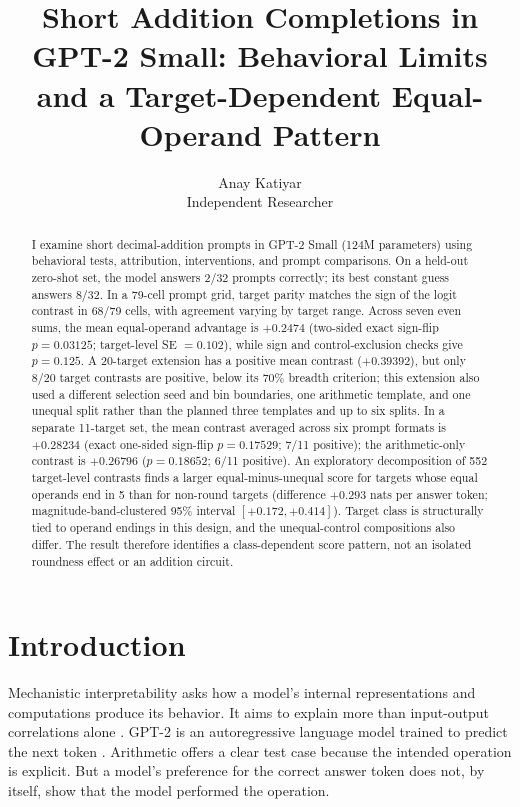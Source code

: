 \documentclass[11pt]{article}
\title{Short Addition Completions in GPT-2 Small: Behavioral Limits and a Target-Dependent Equal-Operand Pattern}
\author{Anay Katiyar\\\small Independent Researcher}
\date{}
\begin{document}
\maketitle

\begin{abstract}
I examine short decimal-addition prompts in GPT-2 Small (124M parameters) using behavioral tests, attribution, interventions, and prompt comparisons. On a held-out zero-shot set, the model answers 2/32 prompts correctly; its best constant guess answers 8/32. In a 79-cell prompt grid, target parity matches the sign of the logit contrast in 68/79 cells, with agreement varying by target range. Across seven even sums, the mean equal-operand advantage is $+0.2474$ (two-sided exact sign-flip $p=0.03125$; target-level SE $=0.102$), while sign and control-exclusion checks give $p=0.125$. A 20-target extension has a positive mean contrast ($+0.39392$), but only 8/20 target contrasts are positive, below its 70\% breadth criterion; this extension also used a different selection seed and bin boundaries, one arithmetic template, and one unequal split rather than the planned three templates and up to six splits. In a separate 11-target set, the mean contrast averaged across six prompt formats is $+0.28234$ (exact one-sided sign-flip $p=0.17529$; 7/11 positive); the arithmetic-only contrast is $+0.26796$ ($p=0.18652$; 6/11 positive). An exploratory decomposition of 552 target-level contrasts finds a larger equal-minus-unequal score for targets whose equal operands end in 5 than for non-round targets (difference $+0.293$ nats per answer token; magnitude-band-clustered 95\% interval $[+0.172,+0.414]$). Target class is structurally tied to operand endings in this design, and the unequal-control compositions also differ. The result therefore identifies a class-dependent score pattern, not an isolated roundness effect or an addition circuit.
\end{abstract}

\section{Introduction}

Mechanistic interpretability asks how a model's internal representations and computations produce its behavior. It aims to explain more than input-output correlations alone \cite{elhage2021framework}. GPT-2 is an autoregressive language model trained to predict the next token \cite{radford2019gpt2}. Arithmetic offers a clear test case because the intended operation is explicit. But a model's preference for the correct answer token does not, by itself, show that the model performed the operation.
\end{document}
